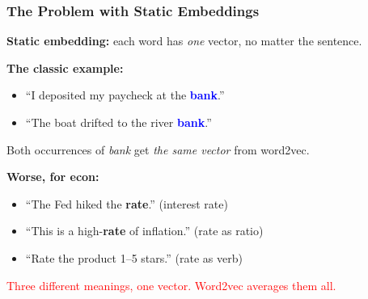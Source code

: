 \documentclass[notes,11pt, aspectratio=169]{beamer}
\begin{document}
\begin{frame}
\frametitle{The Problem with Static Embeddings}

\textbf{Static embedding:} each word has \emph{one} vector, no matter the sentence.

\vspace{8pt}
\textbf{The classic example:}

\vspace{4pt}
\begin{itemize}
    \item ``I deposited my paycheck at the \textcolor{blue}{\textbf{bank}}.''
    \item ``The boat drifted to the river \textcolor{blue}{\textbf{bank}}.''
\end{itemize}

\vspace{6pt}
Both occurrences of \textit{bank} get \emph{the same vector} from word2vec.

\vspace{8pt}
\textbf{Worse, for econ:}
\begin{itemize}
    \item ``The Fed hiked the \textbf{rate}.'' (interest rate)
    \item ``This is a high-\textbf{rate} of inflation.'' (rate as ratio)
    \item ``Rate the product 1--5 stars.'' (rate as verb)
\end{itemize}

\vspace{4pt}
\textcolor{red}{Three different meanings, one vector. Word2vec averages them all.}
\end{frame}
\end{document}
